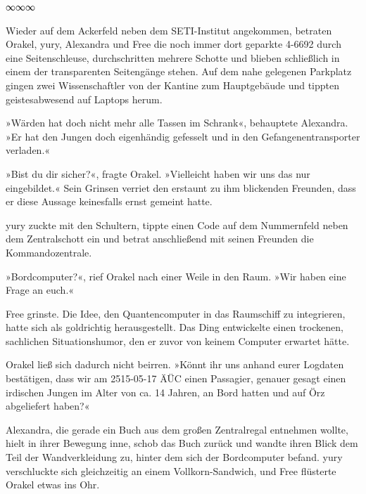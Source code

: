 \begin{center}
∞∞∞
\end{center}

Wieder auf dem Ackerfeld neben dem SETI-Institut angekommen, betraten Orakel, yury, Alexandra und Free die noch immer dort geparkte 4-6692 durch eine Seitenschleuse, durchschritten mehrere Schotte und blieben schließlich in einem der transparenten Seitengänge stehen. Auf dem nahe gelegenen Parkplatz gingen zwei Wissenschaftler von der Kantine zum Hauptgebäude und tippten geistesabwesend auf Laptops herum.

»Wärden hat doch nicht mehr alle Tassen im Schrank«, behauptete Alexandra. »Er hat den Jungen doch eigenhändig gefesselt und in den Gefangenentransporter verladen.«

»Bist du dir sicher?«, fragte Orakel. »Vielleicht haben wir uns das nur eingebildet.« Sein Grinsen verriet den erstaunt zu ihm blickenden Freunden, dass er diese Aussage keinesfalls ernst gemeint hatte.

yury zuckte mit den Schultern, tippte einen Code auf dem Nummernfeld neben dem Zentralschott ein und betrat anschließend mit seinen Freunden die Kommandozentrale.

»Bordcomputer?«, rief Orakel nach einer Weile in den Raum. »Wir haben eine Frage an euch.«


Free grinste. Die Idee, den Quantencomputer in das Raumschiff zu integrieren, hatte sich als goldrichtig herausgestellt. Das Ding entwickelte einen trockenen, sachlichen Situationshumor, den er zuvor von keinem Computer erwartet hätte.

Orakel ließ sich dadurch nicht beirren. »Könnt ihr uns anhand eurer Logdaten bestätigen, dass wir am 2515-05-17 ÄÜC einen Passagier, genauer gesagt einen irdischen Jungen im Alter von ca. 14 Jahren, an Bord hatten und auf Örz abgeliefert haben?«


Alexandra, die gerade ein Buch aus dem großen Zentralregal entnehmen wollte, hielt in ihrer Bewegung inne, schob das Buch zurück und wandte ihren Blick dem Teil der Wandverkleidung zu, hinter dem sich der Bordcomputer befand. yury verschluckte sich gleichzeitig an einem Vollkorn-Sandwich, und Free flüsterte Orakel etwas ins Ohr.

